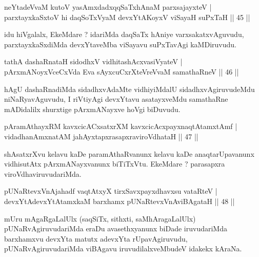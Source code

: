 
\begin{shl}
neYtadeVvaM kutoV yasAmxdadxqqSaTxhAnaM parxsajayxteV  | \\
parxtayxkaSxtoV hi daqSoTxV\s yaM devxYtAKoyxV viSayaH suPxTaH \hfill||  45 ||  
\end{shl}

\begin{artha}
idu hiVgalalx, EkeMdare ? idariMda daqSaTx hAniye varxsakatxvAguvudu, parxtayxkaSxdiMda devxYtaveMba viSayavu suPxTavAgi kaMDiruvudu.
\end{artha}

\begin{shl}
tathA dashaRnataH sidodhxV vidhitashAcxvasiVyateV  | \\
pArxmANoyxVceCxVda Eva sAyxcuCxrXteVreVvaM samathaRneV \hfill||  46 ||  
\end{shl}

\begin{artha}
hAgU dashaRnadiMda sidadhxvAdaMte vidhiyiMdalU sidadhxvAgiruvudeMdu niNaRyavAguvudu, I riVtiyAgi devxYtavu asatayxveMdu samathaRne mADidalilx shurxtige pArxmANayxve hoVgi biDuvudu.
\end{artha}


\begin{shl}
pAramAthayxRM kavxcicACxsatxrXM kavxcicAcxpayxnaqtAtamxtAmf  | \\
vidadhanAmxnatAM ja{\null}hAyxtapxrasapxraviroVdhataH \hfill||  47 ||  
\end{shl}

\begin{artha}
shAsatxrXvu kelavu kaDe paramAthaRvanunx kelavu kaDe anaqtarUpavanunx vidhisutAtx pArxmANayxvanunx biTiTxVtu. EkeMdare ? parasapxra viroVdhaviruvudariMda.
\end{artha}

\begin{shl}
pUNaRtevxVnAja{\null}hadf vaqtAtxyX tirxSavxpayxdhavxsu vataRteV  | \\
devxYtAdevxYtAtamxkaM barxhamx pUNaRtevxVnAviBAgataH \hfill||  48 ||  
\end{shl}

\begin{artha}
mUru mAgaRgaLalUlx (saqSiTx, sithxti, saMhAragaLalUlx) pUNaRvAgiruvudariMda eraDu avasethxyanunx biDade iruvudariMda barxhamxvu devxYta matutx adevxYta rUpavAgiruvudu, pUNaRvAgiruvudariMda viBAgavu iruvudilalxveMbudeV idakekx kAraNa.
\end{artha}

